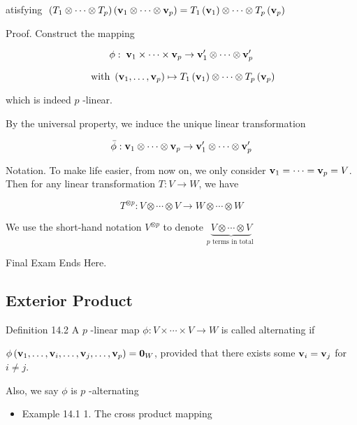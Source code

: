\documentclass[11pt]{article}
\begin{document}
atisfying \(\;\left( {{T}_1 \otimes  \cdots  \otimes  {T}_{p}}\right) \left( {{\bf v}_1 \otimes  \cdots  \otimes  {\bf v}_{p}}\right)  = {T}_1\left( {\bf v}_1\right)  \otimes  \cdots  \otimes  {T}_{p}\left( {\bf v}_{p}\right)\)

Proof. Construct the mapping

\[
\phi  : \;{\bf v}_1 \times  \cdots  \times  {\bf v}_{p} \rightarrow  {\bf v}_1^{\prime } \otimes  \cdots  \otimes  {\bf v}_{p}^{\prime }
\]

\[
\text{ with }\left( {{\bf v}_1,\ldots ,{\bf v}_{p}}\right)  \mapsto  {T}_1\left( {\bf v}_1\right)  \otimes  \cdots  \otimes  {T}_{p}\left( {\bf v}_{p}\right)
\]

which is indeed \(p\) -linear.

By the universal property, we induce the unique linear transformation

\[
\bar{\phi } : {\bf v}_1 \otimes  \cdots  \otimes  {\bf v}_{p} \rightarrow  {\bf v}_1^{\prime } \otimes  \cdots  \otimes  {\bf v}_{p}^{\prime }
\]

Notation. To make life easier, from now on, we only consider \({\bf v}_1 = \cdots  = {\bf v}_{p} = V\). Then for any linear transformation \(T : V \rightarrow  W\), we have

\[
{T}^{\otimes p} : V \otimes  \cdots  \otimes  V \rightarrow  W \otimes  \cdots  \otimes  W
\]

We use the short-hand notation \({V}^{\otimes p}\) to denote \(\underset{p\text{ terms in total }}{\underbrace{V \otimes  \cdots  \otimes  V}}\)

Final Exam Ends Here.

\subsection{Exterior Product}

Definition 14.2 A \(p\) -linear map \(\phi  : V \times  \cdots  \times  V \rightarrow  W\) is called alternating if

\(\phi \left( {{\bf v}_1,\ldots ,{\bf v}_{i},\ldots ,{\bf v}_{j},\ldots ,{\bf v}_{p}}\right)  = {\mathbf{0}}_{W}\), provided that there exists some \({\bf v}_{i} = {\bf v}_{j}\) for \(i \neq  j\).

Also, we say \(\phi\) is \(p\) -alternating

\begin{itemize}
\item Example 14.1 1. The cross product mapping
\end{itemize}
\end{document}
